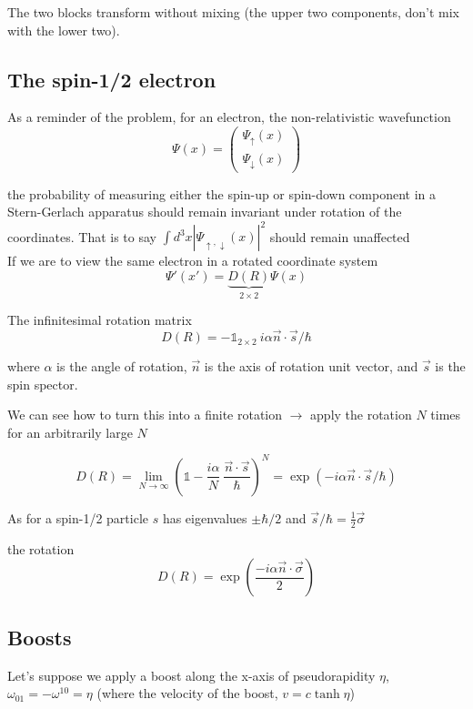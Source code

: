 \documentclass[11pt]{article}
\begin{document}
		 The two blocks transform without mixing (the upper two components, don't mix with the lower two).\\
		 
		 \subsection*{The spin-1/2 electron}
		 
		 As a reminder of the problem, for an electron, the non-relativistic wavefunction \[ \Psi(x) = \begin{pmatrix}
		 	\Psi_{\uparrow}(x) \\ \Psi_{\downarrow}(x)
		 \end{pmatrix}\]
	 
	 	the probability of measuring either the spin-up or spin-down component in a Stern-Gerlach apparatus should remain invariant under rotation of the coordinates. That is to say $\int d^3x |\Psi_{\uparrow, \downarrow}(x)|^2 $ should remain unaffected\\
	 	
	 	If we are to view the same electron in a rotated coordinate system \[ \Psi'(x') = \underbrace{D(R)}_{2\times 2} \Psi(x)\]

		The infinitesimal rotation matrix $$D(R) = -\mathbb{1}_{2\times 2}\ i\alpha\vec{n}\cdot \vec{s}/\hbar$$

		where $\alpha$ is the angle of rotation, $\vec{n}$ is the axis of rotation unit vector, and $\vec{s}$ is the spin spector.
	 	
	 	We can see how to turn this into a finite rotation $\rightarrow$ apply the rotation $N$ times for an arbitrarily large $N$
	 	
	 	\[ D(R) = \lim_{N\to\infty} \left( \mathbb{1} - \frac{i\alpha}{N}\ \frac{\vec{n}
	 		\cdot \vec{s}}{\hbar} \right)^N = \exp(-i\alpha\vec{n}\cdot\vec{s}/\hbar) \]
	 	
	 	As for a spin-1/2 particle $s$ has eigenvalues $\pm \hbar/2$ and $\vec{s}/\hbar = \frac{1}{2}\vec{\sigma}$
	 	
	 	the rotation \[ D(R) = \exp (\frac{-i\alpha\vec{n}\cdot \vec{\sigma}}{2}) \]
	 	 
	 	 \subsection*{Boosts}
	 	 Let's suppose we apply a boost along the x-axis of pseudorapidity $\eta$, $\omega_{01} = -\omega^{10} = \eta$ (where the velocity of the boost, $v = c \tanh \eta$)
	 	 
\end{document}
